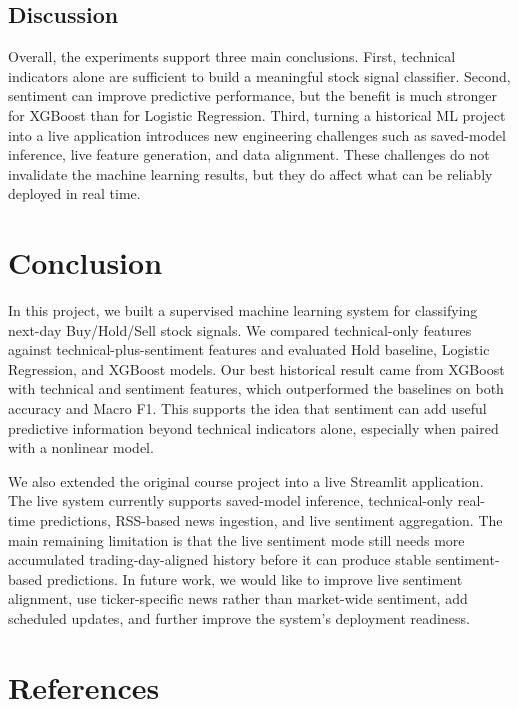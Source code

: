 \documentclass[11pt]{article}
\begin{document}
\subsection{Discussion}

Overall, the experiments support three main conclusions. First, technical indicators alone are sufficient to build a meaningful stock signal classifier. Second, sentiment can improve predictive performance, but the benefit is much stronger for XGBoost than for Logistic Regression. Third, turning a historical ML project into a live application introduces new engineering challenges such as saved-model inference, live feature generation, and data alignment. These challenges do not invalidate the machine learning results, but they do affect what can be reliably deployed in real time.

\section{Conclusion}

In this project, we built a supervised machine learning system for classifying next-day Buy/Hold/Sell stock signals. We compared technical-only features against technical-plus-sentiment features and evaluated Hold baseline, Logistic Regression, and XGBoost models. Our best historical result came from XGBoost with technical and sentiment features, which outperformed the baselines on both accuracy and Macro F1. This supports the idea that sentiment can add useful predictive information beyond technical indicators alone, especially when paired with a nonlinear model.

We also extended the original course project into a live Streamlit application. The live system currently supports saved-model inference, technical-only real-time predictions, RSS-based news ingestion, and live sentiment aggregation. The main remaining limitation is that the live sentiment mode still needs more accumulated trading-day-aligned history before it can produce stable sentiment-based predictions. In future work, we would like to improve live sentiment alignment, use ticker-specific news rather than market-wide sentiment, add scheduled updates, and further improve the system's deployment readiness.

\section{References}
\end{document}
